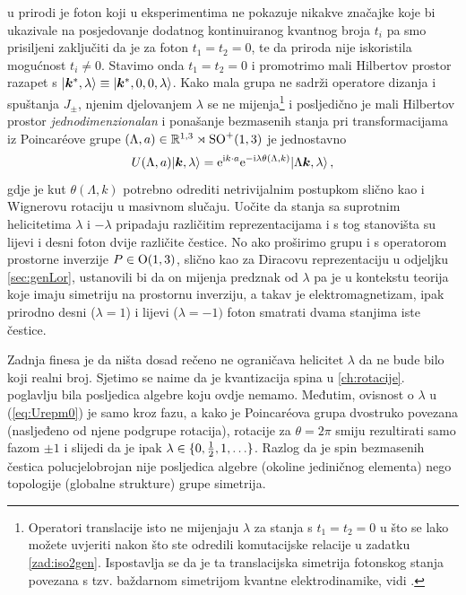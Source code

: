 u prirodi je foton koji u eksperimentima ne pokazuje nikakve značajke
koje bi ukazivale na posjedovanje dodatnog kontinuiranog kvantnog broja
$t_i$ pa smo prisiljeni zaključiti da je za foton $t_1=t_2=0$,
te da priroda nije iskoristila mogućnost $t_i \neq 0$.
Stavimo onda $t_1=t_2=0$ i promotrimo mali Hilbertov prostor
razapet s $\ket{\vec{k}^{*}, \lambda} \equiv \ket{\vec{k}^{*}, 0, 0, \lambda}$.
Kako mala grupa ne sadrži
operatore dizanja i spuštanja $J_{\pm}$, njenim djelovanjem $\lambda$
se ne mijenja\footnote{Operatori translacije isto ne mijenjaju $\lambda$
    za stanja s $t_1=t_2=0$ u što se lako možete uvjeriti nakon što
ste odredili komutacijske relacije u zadatku \ref{zad:iso2gen}.
Ispostavlja se da je ta translacijska simetrija fotonskog stanja povezana s tzv.
baždarnom simetrijom kvantne elektrodinamike, vidi \cite{Weinberg:1995mt}.}
i posljedično je mali Hilbertov prostor \emph{jednodimenzionalan} i
ponašanje bezmasenih stanja pri
transformacijama iz Poincar\'{e}ove grupe 
$(\Lambda, a) \in \mathbb{R}^{1,3}\rtimes\mathrm{SO}^{+}(1,3)$ je jednostavno
\begin{equation}
    U(\Lambda, a) \ket{\vec{k}, \lambda} = \rme^{\rmi k\cdot a}
    \rme^{-\rmi \lambda \theta(\Lambda, k)} \ket{\Lambda\vec{k}, \lambda} \,,
    \label{eq:Urepm0}
\end{equation}
gdje je kut $\theta(\Lambda, k)$ potrebno odrediti netrivijalnim postupkom slično kao
i Wignerovu rotaciju u masivnom slučaju.
Uočite da stanja sa suprotnim helicitetima $\lambda$ i $-\lambda$ pripadaju
različitim reprezentacijama
i s tog stanovišta su lijevi i desni foton dvije različite čestice.
No ako proširimo grupu i s operatorom prostorne inverzije $P\in \mathrm{O}(1,3)$, slično kao za Diracovu
reprezentaciju u odjeljku \ref{sec:genLor}, ustanovili bi da
on mijenja predznak od $\lambda$ pa je u kontekstu teorija koje
imaju simetriju na prostornu inverziju, a takav je elektromagnetizam,
ipak prirodno desni ($\lambda=1$) i lijevi ($\lambda=-1)$ 
foton smatrati dvama stanjima iste čestice.

Zadnja finesa je da ništa dosad rečeno ne ograničava helicitet $\lambda$ 
da ne bude bilo koji realni broj. Sjetimo se naime da je kvantizacija
spina u \ref{ch:rotacije}. poglavlju bila posljedica  algebre
koju ovdje nemamo. Međutim, ovisnost o $\lambda$
u (\ref{eq:Urepm0}) je samo kroz fazu, a kako je Poincar\'{e}ova grupa
dvostruko povezana (nasljeđeno od njene  podgrupe rotacija),
rotacije za $\theta=2\pi$ smiju rezultirati samo fazom $\pm 1$ i
slijedi da je ipak $\lambda \in \{0, \frac{1}{2}, 1, \ldots\}$. Razlog
da je spin bezmasenih čestica polucjelobrojan nije posljedica
algebre (okoline jediničnog elementa) nego topologije (globalne strukture)
grupe simetrija.





